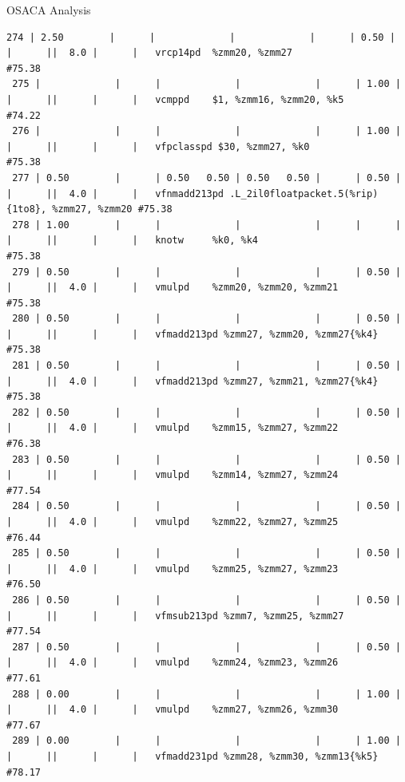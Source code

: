 \documentclass[aspectratio=43,t]{beamer}
\begin{document}
\begin{frame}[fragile]{OSACA Analysis}
\begin{lstlisting}[basicstyle=\tt\tiny]
 274 | 2.50        |      |             |             |      | 0.50 |      |      ||  8.0 |      |   vrcp14pd  %zmm20, %zmm27                                #75.38
 275 |             |      |             |             |      | 1.00 |      |      ||      |      |   vcmppd    $1, %zmm16, %zmm20, %k5                       #74.22
 276 |             |      |             |             |      | 1.00 |      |      ||      |      |   vfpclasspd $30, %zmm27, %k0                             #75.38
 277 | 0.50        |      | 0.50   0.50 | 0.50   0.50 |      | 0.50 |      |      ||  4.0 |      |   vfnmadd213pd .L_2il0floatpacket.5(%rip){1to8}, %zmm27, %zmm20 #75.38
 278 | 1.00        |      |             |             |      |      |      |      ||      |      |   knotw     %k0, %k4                                      #75.38
 279 | 0.50        |      |             |             |      | 0.50 |      |      ||  4.0 |      |   vmulpd    %zmm20, %zmm20, %zmm21                        #75.38
 280 | 0.50        |      |             |             |      | 0.50 |      |      ||      |      |   vfmadd213pd %zmm27, %zmm20, %zmm27{%k4}                 #75.38
 281 | 0.50        |      |             |             |      | 0.50 |      |      ||  4.0 |      |   vfmadd213pd %zmm27, %zmm21, %zmm27{%k4}                 #75.38
 282 | 0.50        |      |             |             |      | 0.50 |      |      ||  4.0 |      |   vmulpd    %zmm15, %zmm27, %zmm22                        #76.38
 283 | 0.50        |      |             |             |      | 0.50 |      |      ||      |      |   vmulpd    %zmm14, %zmm27, %zmm24                        #77.54
 284 | 0.50        |      |             |             |      | 0.50 |      |      ||  4.0 |      |   vmulpd    %zmm22, %zmm27, %zmm25                        #76.44
 285 | 0.50        |      |             |             |      | 0.50 |      |      ||  4.0 |      |   vmulpd    %zmm25, %zmm27, %zmm23                        #76.50
 286 | 0.50        |      |             |             |      | 0.50 |      |      ||      |      |   vfmsub213pd %zmm7, %zmm25, %zmm27                       #77.54
 287 | 0.50        |      |             |             |      | 0.50 |      |      ||  4.0 |      |   vmulpd    %zmm24, %zmm23, %zmm26                        #77.61
 288 | 0.00        |      |             |             |      | 1.00 |      |      ||  4.0 |      |   vmulpd    %zmm27, %zmm26, %zmm30                        #77.67
 289 | 0.00        |      |             |             |      | 1.00 |      |      ||      |      |   vfmadd231pd %zmm28, %zmm30, %zmm13{%k5}                 #78.17

\end{lstlisting}
\end{frame}
\end{document}
